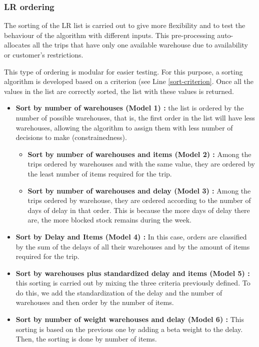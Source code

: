 \documentclass[letterpaper]{article} %
\begin{document}
\subsubsection*{LR ordering}
The sorting of the LR list is carried out to give more flexibility and to test the behaviour of the algorithm with different inputs. This pre-processing auto-allocates all the trips that have only one available warehouse due to availability or customer's restrictions.

This type of ordering is modular for easier testing. For this purpose, a sorting algorithm is developed based on a criterion (see Line \ref{sort-criterion}. Once all the values in the list are correctly sorted, the list with these values is returned.


\begin{itemize}
    \item \textbf{Sort by number of warehouses (Model 1) :} the list is ordered by the number of possible warehouses, that is, the first order in the list will have less warehouses, allowing the algorithm to assign them with less number of decisions to make (constrainedness).
    \begin{itemize}
        \item \textbf{Sort by number of warehouses and items (Model 2) :} Among the trips ordered by warehouses and with the same value, they are ordered by the least number of items required for the trip.
        \item \textbf{Sort by number of warehouses and delay (Model 3) :} Among the trips ordered by warehouse, they are ordered according to the number of days of delay in that order. This is because the more days of delay there are, the more blocked stock remains during the week.
    \end{itemize}
    \item \textbf{Sort by Delay and Items (Model 4) :} In this case, orders are classified by the sum of the delays of all their warehouses and by the amount of items required for the trip.

    \item \textbf{Sort by warehouses plus standardized delay and items (Model 5) :} this sorting is carried out by mixing the three criteria previously defined. To do this, we add the standardization of the delay and the number of warehouses and then order by the number of items.
    \item \textbf{Sort by number of weight warehouses and delay (Model 6) :} This sorting is based on the previous one by adding a beta weight to the delay. Then, the sorting is done by number of items.
\end{itemize}
\end{document}
